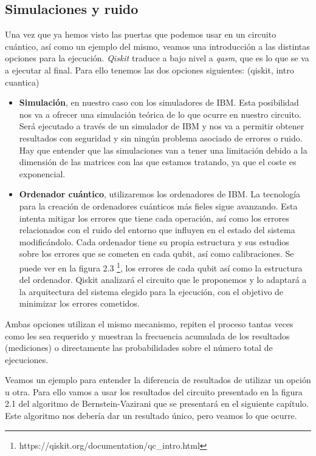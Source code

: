 \subsection{Simulaciones y ruido} 
 Una vez que ya hemos visto las puertas que podemos usar en un circuito cuántico, así como un ejemplo del mismo, veamos una introducción a las distintas opciones para la ejecución. \textit{Qiskit} traduce a bajo nivel a \textit{qasm}, que es lo que se va a ejecutar al final. Para ello tenemos las dos opciones siguientes: (qiskit, intro cuantica)
 
 \begin{itemize}
     \item \textbf{Simulación}, en nuestro caso con los simuladores de IBM. Esta posibilidad nos va a ofrecer una simulación teórica de lo que ocurre en nuestro circuito. Será ejecutado a través de un simulador de IBM y nos va a permitir obtener resultados con seguridad y sin ningún problema asociado de errores o ruido. Hay que entender que las simulaciones van a tener una limitación debido a la dimensión de las matrices con las que estamos tratando, ya que el coste es exponencial.
     
     \item \textbf{Ordenador cuántico}, utilizaremos los ordenadores de IBM. La tecnología para la creación de ordenadores cuánticos más fieles sigue avanzando. Esta intenta mitigar los errores que tiene cada operación, así como los errores relacionados con el ruido del entorno que influyen en el estado del sistema modificándolo. Cada ordenador tiene su propia estructura y sus estudios sobre los errores que se cometen en cada qubit, así como calibraciones. Se puede ver en la figura 2.3 \footnote{https://qiskit.org/documentation/qc\_intro.html}, los errores de cada qubit así como la estructura del ordenador. Qiskit analizará el circuito que le proponemos y lo adaptará a la arquitectura del sistema elegido para la ejecución, con el objetivo de minimizar los errores cometidos.
     
 \end{itemize}

 Ambas opciones utilizan el mismo mecanismo, repiten el proceso tantas veces como les sea requerido y muestran la frecuencia acumulada de los resultados (mediciones) o directamente las probabilidades sobre el número total de ejecuciones. \newline

 Veamos un ejemplo para entender la diferencia de resultados de utilizar un opción u otra. Para ello vamos a usar los resultados del circuito presentado en la figura 2.1 del algoritmo de Bernstein-Vazirani que se presentará en el siguiente capítulo. Este algoritmo nos debería dar un resultado único, pero veamos lo que ocurre. \newline
 
